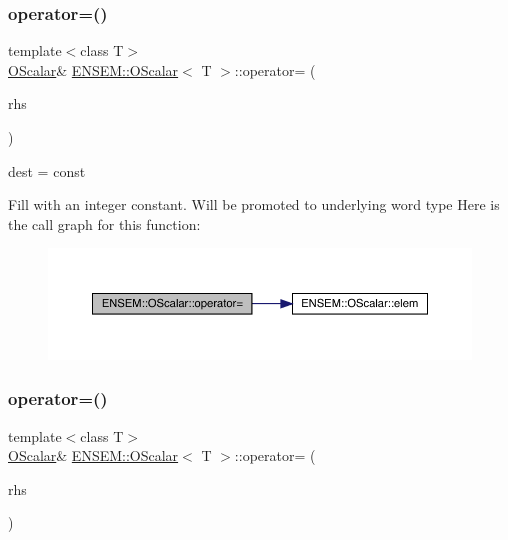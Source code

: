 \subsubsection{\texorpdfstring{operator=()}{operator=()}\hspace{0.1cm}{\footnotesize\ttfamily [2/12]}}
{\footnotesize\ttfamily template$<$class T$>$ \\
\mbox{\hyperlink{classENSEM_1_1OScalar}{O\+Scalar}}\& \mbox{\hyperlink{classENSEM_1_1OScalar}{E\+N\+S\+E\+M\+::\+O\+Scalar}}$<$ T $>$\+::operator= (\begin{DoxyParamCaption}\item[{const typename \mbox{\hyperlink{structENSEM_1_1WordType}{Word\+Type}}$<$ T $>$\+::Type\+\_\+t \&}]{rhs }\end{DoxyParamCaption})\hspace{0.3cm}{\ttfamily [inline]}}



dest = const 

Fill with an integer constant. Will be promoted to underlying word type Here is the call graph for this function\+:
\nopagebreak
\begin{figure}[H]
\begin{center}
\leavevmode
\includegraphics[width=350pt]{da/d80/classENSEM_1_1OScalar_a88bbb49d2879dba60c29d7792a8af8dc_cgraph}
\end{center}
\end{figure}
\mbox{\label{classENSEM_1_1OScalar_a88bbb49d2879dba60c29d7792a8af8dc}} 
\subsubsection{\texorpdfstring{operator=()}{operator=()}\hspace{0.1cm}{\footnotesize\ttfamily [3/12]}}
{\footnotesize\ttfamily template$<$class T$>$ \\
\mbox{\hyperlink{classENSEM_1_1OScalar}{O\+Scalar}}\& \mbox{\hyperlink{classENSEM_1_1OScalar}{E\+N\+S\+E\+M\+::\+O\+Scalar}}$<$ T $>$\+::operator= (\begin{DoxyParamCaption}\item[{const typename \mbox{\hyperlink{structENSEM_1_1WordType}{Word\+Type}}$<$ T $>$\+::Type\+\_\+t \&}]{rhs }\end{DoxyParamCaption})\hspace{0.3cm}{\ttfamily [inline]}}



